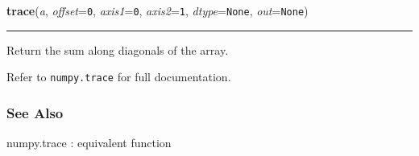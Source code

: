     \label{numpy:ndarray:trace}

    \vspace{0.5ex}

    \begin{boxedminipage}{\textwidth}

    \raggedright \textbf{trace}(\textit{a}, \textit{offset}=\texttt{0}, \textit{axis1}=\texttt{0}, \textit{axis2}=\texttt{1}, \textit{dtype}=\texttt{None}, \textit{out}=\texttt{None})

    \vspace{-1.5ex}

    \rule{\textwidth}{0.5\fboxrule}

Return the sum along diagonals of the array.

Refer to \texttt{numpy.trace} for full documentation.



\hypertarget{see-also}{}
\subsubsection*{See Also}

numpy.trace : equivalent function
    \vspace{1ex}

    \end{boxedminipage}

    \label{numpy:ndarray:transpose}

    \vspace{0.5ex}

